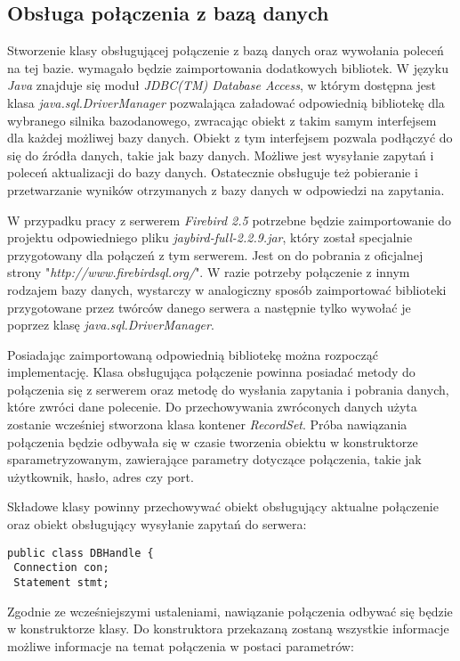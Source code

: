 \subsection{Obsługa połączenia z bazą danych}

Stworzenie klasy obsługującej połączenie z bazą danych oraz wywołania poleceń na tej bazie. wymagało będzie zaimportowania dodatkowych bibliotek. W języku \emph{Java} znajduje się moduł \emph{ JDBC(TM) Database Access}, w którym dostępna jest klasa \emph{java.sql.DriverManager} pozwalająca załadować odpowiednią bibliotekę dla wybranego silnika bazodanowego, zwracając obiekt z takim samym interfejsem dla każdej możliwej bazy danych.   Obiekt z tym interfejsem pozwala podłączyć do się do źródła danych, takie jak bazy danych. Możliwe jest wysyłanie zapytań i poleceń aktualizacji do bazy danych. Ostatecznie obsługuje też pobieranie i przetwarzanie wyników otrzymanych z bazy danych w odpowiedzi na zapytania. 
\par
W przypadku pracy z serwerem \emph{Firebird 2.5} potrzebne będzie zaimportowanie do projektu odpowiedniego pliku \emph{jaybird-full-2.2.9.jar}, który został specjalnie przygotowany dla połączeń z tym serwerem. Jest on do pobrania z oficjalnej strony "\emph{http://www.firebirdsql.org/}". W razie potrzeby połączenie z innym rodzajem bazy danych, wystarczy w analogiczny sposób zaimportować biblioteki przygotowane przez twórców danego serwera a następnie tylko wywołać je poprzez klasę \emph{java.sql.DriverManager}.
\par
Posiadając zaimportowaną odpowiednią bibliotekę można rozpocząć implementację. Klasa obsługująca połączenie powinna posiadać metody do połączenia się z serwerem oraz metodę do wysłania zapytania i pobrania danych, które zwróci dane polecenie. Do przechowywania zwróconych danych użyta zostanie wcześniej stworzona klasa kontener \emph{RecordSet}. Próba nawiązania połączenia będzie odbywała się w czasie tworzenia obiektu w konstruktorze sparametryzowanym, zawierające parametry dotyczące połączenia, takie jak użytkownik, hasło, adres czy port.
\par
Składowe klasy powinny przechowywać obiekt obsługujący aktualne połączenie oraz obiekt obsługujący wysyłanie zapytań do serwera:
 \begin{lstlisting}
public class DBHandle {
 Connection con;
 Statement stmt; 
 \end{lstlisting}
  Zgodnie ze wcześniejszymi ustaleniami, nawiązanie połączenia odbywać się będzie w konstruktorze klasy. Do konstruktora przekazaną zostaną wszystkie informacje możliwe informacje na temat połączenia w postaci parametrów:
